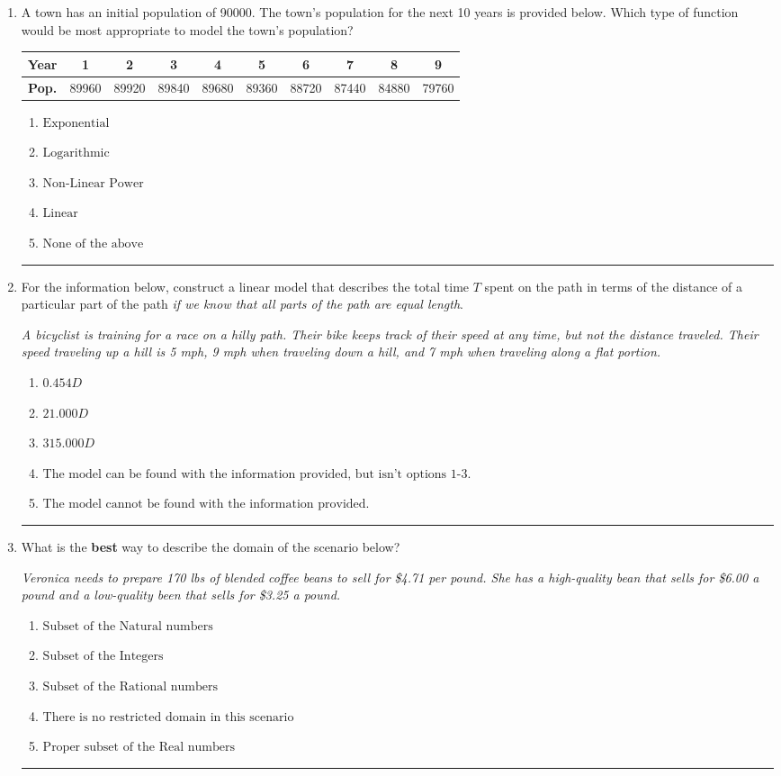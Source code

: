 \documentclass[14pt]{extbook}
\newcommand{\litem}[1]{\item#1\hspace*{-1cm}\rule{\textwidth}{0.4pt}}
\begin{document}
\begin{enumerate}
\litem{
A town has an initial population of 90000. The town's population for the next 10 years is provided below. Which type of function would be most appropriate to model the town's population?


\begin{tabular}{c|c|c|c|c|c|c|c|c|c}
\textbf{Year} & 1 & 2 & 3 & 4 & 5 & 6 & 7 & 8 & 9 \tabularnewline
\hline
\textbf{Pop.} & 89960 & 89920 & 89840 & 89680 & 89360 & 88720 & 87440 & 84880 & 79760
\end{tabular} \begin{enumerate}[label=\Alph*.]
\item \( \text{Exponential} \)
\item \( \text{Logarithmic} \)
\item \( \text{Non-Linear Power} \)
\item \( \text{Linear} \)
\item \( \text{None of the above} \)

\end{enumerate} }
\litem{
For the information below, construct a linear model that describes the total time $T$ spent on the path in terms of the distance of a particular part of the path \textit{if we know that all parts of the path are equal length}.
\begin{center}
    \textit{ A bicyclist is training for a race on a hilly path. Their bike keeps track of their speed at any time, but not the distance traveled. Their speed traveling up a hill is 5 mph, 9 mph when traveling down a hill, and 7 mph when traveling along a flat portion. }
\end{center}
\begin{enumerate}[label=\Alph*.]
\item \( 0.454 D \)
\item \( 21.000 D \)
\item \( 315.000 D \)
\item \( \text{The model can be found with the information provided, but isn't options 1-3.} \)
\item \( \text{The model cannot be found with the information provided.} \)

\end{enumerate} }
\litem{
What is the \textbf{best} way to describe the domain of the scenario below?
\begin{center}
    \textit{ Veronica needs to prepare 170 lbs of blended coffee beans to sell for \$4.71 per pound. She has a high-quality bean that sells for \$6.00 a pound and a low-quality been that sells for \$3.25 a pound. }
\end{center}
\begin{enumerate}[label=\Alph*.]
\item \( \text{Subset of the Natural numbers} \)
\item \( \text{Subset of the Integers} \)
\item \( \text{Subset of the Rational numbers} \)
\item \( \text{There is no restricted domain in this scenario} \)
\item \( \text{Proper subset of the Real numbers} \)


\end{enumerate}}
\end{enumerate}
\end{document}
